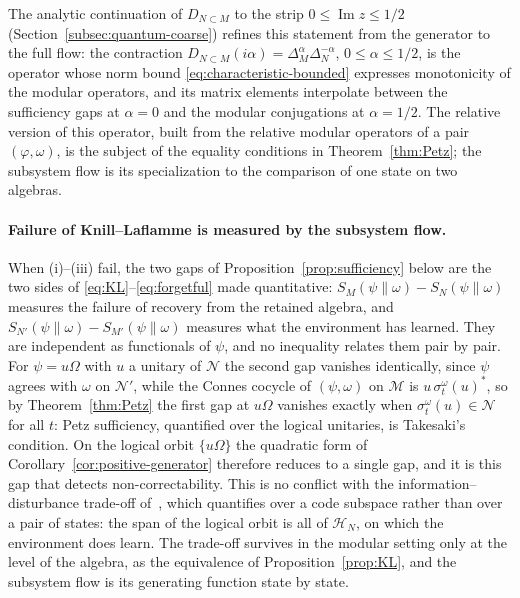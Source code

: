 \documentclass[a4paper,11pt]{article}
\theoremstyle{definition}
\begin{document}
The analytic continuation of $D_{N\subset M}$ to the strip $0\le\operatorname{Im}z\le1/2$ (Section~\ref{subsec:quantum-coarse}) refines this statement from the generator to the full flow: the contraction $D_{N\subset M}(i\alpha)=\Delta_M^{\alpha}\Delta_N^{-\alpha}$, $0\le\alpha\le1/2$, is the operator whose norm bound \eqref{eq:characteristic-bounded} expresses monotonicity of the modular operators, and its matrix elements interpolate between the sufficiency gaps at $\alpha=0$ and the modular conjugations at $\alpha=1/2$. The relative version of this operator, built from the relative modular operators of a pair $(\varphi,\omega)$, is the subject of the equality conditions in Theorem~\ref{thm:Petz}; the subsystem flow is its specialization to the comparison of one state on two algebras.


\paragraph{Failure of Knill--Laflamme is measured by the subsystem flow.}
When (i)--(iii) fail, the two gaps of Proposition~\ref{prop:sufficiency} below are the two sides of \eqref{eq:KL}--\eqref{eq:forgetful} made quantitative: $S_M(\psi\|\omega)-S_N(\psi\|\omega)$ measures the failure of recovery from the retained algebra, and $S_{N'}(\psi\|\omega)-S_{M'}(\psi\|\omega)$ measures what the environment has learned. They are independent as functionals of $\psi$, and no inequality relates them pair by pair. For $\psi=u\Omega$ with $u$ a unitary of $\mathcal N$ the second gap vanishes identically, since $\psi$ agrees with $\omega$ on $\mathcal N'$, while the Connes cocycle of $(\psi,\omega)$ on $\mathcal M$ is $u\,\sigma^\omega_t(u)^*$, so by Theorem~\ref{thm:Petz} the first gap at $u\Omega$ vanishes exactly when $\sigma^\omega_t(u)\in\mathcal N$ for all $t$: Petz sufficiency, quantified over the logical unitaries, is Takesaki's condition. On the logical orbit $\{u\Omega\}$ the quadratic form of Corollary~\ref{cor:positive-generator} therefore reduces to a single gap, and it is this gap that detects non-correctability. This is no conflict with the information--disturbance trade-off of~\cite{KretschmannSchlingemannWerner2008}, which quantifies over a code subspace rather than over a pair of states: the span of the logical orbit is all of $\mathcal H_N$, on which the environment does learn. The trade-off survives in the modular setting only at the level of the algebra, as the equivalence of Proposition~\ref{prop:KL}, and the subsystem flow is its generating function state by state.
\end{document}
